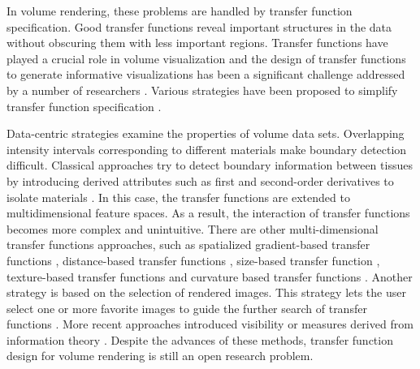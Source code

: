 In volume rendering, these problems are handled by transfer function specification.
Good transfer functions reveal important structures in the data without obscuring them with less important regions.
Transfer functions have played a crucial role in volume visualization and the design of transfer functions to generate informative visualizations has been a significant challenge addressed by a number of researchers \cite{pfister_transfer_2001}.
Various strategies have been proposed to simplify transfer function specification \cite{hadwiger_real-time_2006}.

Data-centric strategies examine the properties of volume data sets. Overlapping intensity intervals corresponding to different materials make boundary detection difficult. Classical approaches try to detect boundary information between tissues by introducing derived attributes such as first and second-order derivatives to isolate materials \cite{kindlmann_semi-automatic_1998} \cite{kniss_multidimensional_2002}. In this case, the transfer functions are extended to multidimensional feature spaces. As a result, the interaction of transfer functions becomes more complex and unintuitive.
There are other multi-dimensional transfer functions approaches, such as spatialized gradient-based transfer functions \cite{roettger_spatialized_2005}, distance-based transfer functions \cite{tappenbeck_distance-based_2006}, size-based transfer function \cite{correa_size-based_2008}, texture-based transfer functions \cite{caban_texture-based_2008} and curvature based transfer functions \cite{kindlmann_curvature-based_2003}.
Another strategy is based on the selection of rendered images. This strategy lets the user select one or more favorite images to guide the further search of transfer functions \cite{marks_design_1997} \cite{wu_interactive_2007}. More recent approaches introduced visibility \cite{correa_visibility_2011} or measures derived from information theory \cite{haidacher_information-based_2008} \cite{bruckner_isosurface_2010} \cite{ruiz_automatic_2011} \cite{bramon_information_2013}. Despite the advances of these methods, transfer function design for volume rendering is still an open research problem.

